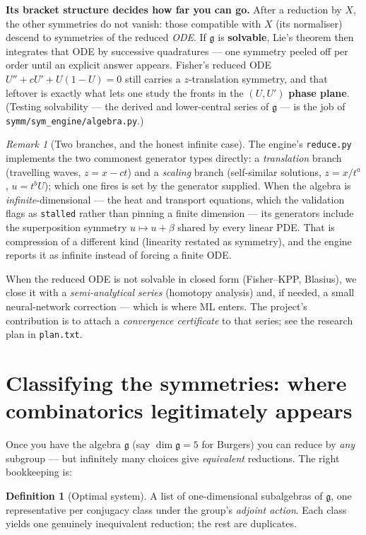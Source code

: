 \documentclass[11pt]{article}
\theoremstyle{definition}
\newtheorem{definition}{Definition}[section]
\theoremstyle{remark}
\newtheorem{remark}{Remark}[section]
\newcommand{\g}{\mathfrak{g}}
\begin{document}
\textbf{Its bracket structure decides how far you can go.} After a reduction by $X$, the other symmetries
do not vanish: those compatible with $X$ (its normaliser) descend to symmetries of the reduced \emph{ODE}.
If $\g$ is \textbf{solvable}, Lie's theorem then integrates that ODE by successive quadratures --- one
symmetry peeled off per order until an explicit answer appears. Fisher's reduced ODE $U''+cU'+U(1-U)=0$
still carries a $z$-translation symmetry, and that leftover is exactly what lets one study the fronts in
the $(U,U')$ \textbf{phase plane}. (Testing solvability --- the derived and lower-central series of $\g$
--- is the job of \texttt{symm/sym\_engine/algebra.py}.)

\begin{remark}[Two branches, and the honest infinite case]
The engine's \texttt{reduce.py} implements the two commonest generator types directly: a
\emph{translation} branch (travelling waves, $z=x-ct$) and a \emph{scaling} branch (self-similar
solutions, $z=x/t^{a}$, $u=t^{b}U$); which one fires is set by the generator supplied. When the algebra
is \emph{infinite}-dimensional --- the heat and transport equations, which the validation flags as
\texttt{stalled} rather than pinning a finite dimension --- its generators include the superposition
symmetry $u\mapsto u+\beta$ shared by every linear PDE. That is compression of a different kind
(linearity restated as symmetry), and the engine reports it as infinite instead of forcing a finite ODE.
\end{remark}

When the reduced ODE is not solvable in closed form (Fisher--KPP, Blasius), we close it with a
\emph{semi-analytical series} (homotopy analysis) and, if needed, a small neural-network correction ---
which is where ML enters. The project's contribution is to attach a \emph{convergence certificate} to
that series; see the research plan in \texttt{plan.txt}.

\section{Classifying the symmetries: where combinatorics legitimately appears}
\label{sec:classify}

Once you have the algebra $\g$ (say $\dim\g=5$ for Burgers) you can reduce by \emph{any} subgroup --- but
infinitely many choices give \emph{equivalent} reductions. The right bookkeeping is:

\begin{definition}[Optimal system]
A list of one-dimensional subalgebras of $\g$, one representative per conjugacy class under the group's
\emph{adjoint action}. Each class yields one genuinely inequivalent reduction; the rest are duplicates.
\end{definition}
\end{document}
